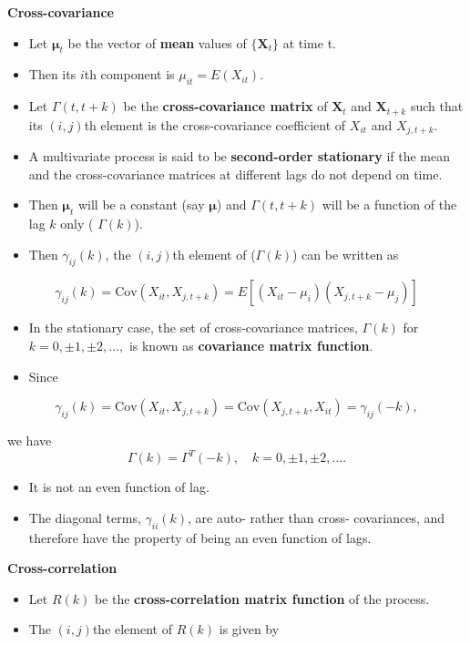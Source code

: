 \documentclass[]{book}
\providecommand{\tightlist}{%
  \setlength{\itemsep}{0pt}\setlength{\parskip}{0pt}}
\begin{document}
\textbf{Cross-covariance}

\begin{itemize}
\tightlist
\item
  Let \(\symbf{\mu}_t\) be the vector of \textbf{mean} values of \(\{\mathbf{X}_t\}\) at time t.
\item
  Then its \(i\)th component is \(\mu_{it}=E(X_{it})\).
\item
  Let \(\Gamma(t,t+k)\) be the \textbf{cross-covariance matrix} of \(\mathbf{X}_t\) and \(\mathbf{X}_{t+k}\) such that its \((i,j)\)th element is the cross-covariance coefficient of \(X_{it}\) and \(X_{j, t+k}.\)
\item
  A multivariate process is said to be \textbf{second-order stationary} if the mean and the cross-covariance matrices at different lags do not depend on time.
\item
  Then \(\symbf{\mu}_t\) will be a constant (say \(\symbf{\mu}\)) and \(\Gamma(t,t+k)\) will be a function of the lag \(k\) only ( \(\Gamma(k)\)).
\item
  Then \(\gamma_{ij}(k)\), the \((i,j)\)th element of (\(\Gamma(k)\)) can be written as
\end{itemize}

\[\gamma_{ij}(k)=\text{Cov}(X_{it},X_{j,t+k} )= E[(X_{it}-\mu_i)(X_{j,t+k}-\mu_j)]\]

\begin{itemize}
\tightlist
\item
  In the stationary case, the set of cross-covariance matrices, \(\Gamma(k)\) for \(k=0, \pm1, \pm2, \dots,\) is known as \textbf{covariance matrix function}.
\item
  Since
\end{itemize}

\[\gamma_{ij}(k)= \text{Cov}(X_{it},X_{j,t+k} )= \text{Cov}(X_{j,t+k}, X_{it} ) = \gamma_{ij}(-k),\]

we have
\[\Gamma(k)=\Gamma^T(-k), \quad k=0, \pm1, \pm2, \dots.\]

\begin{itemize}
\tightlist
\item
  It is not an even function of lag.
\item
  The diagonal terms, \(\gamma_{ii}(k)\), are auto- rather than cross- covariances, and therefore have the property of being an even function of lags.
\end{itemize}

\textbf{Cross-correlation}

\begin{itemize}
\tightlist
\item
  Let \(R(k)\) be the \textbf{cross-correlation matrix function} of the process.
\item
  The \((i,j)\)the element of \(R(k)\) is given by
\end{itemize}
\end{document}
